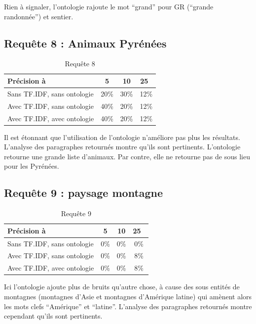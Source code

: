 \documentclass{article}
\begin{document}
Rien à signaler, l’ontologie rajoute le mot “grand” pour GR (“grande randonnée”) et
sentier.

\subsection{Requête 8 : \og Animaux Pyrénées \fg }

\begin{table}[H]
    \centering
    \caption{Requête 8}
\begin{tabular}{|l|c|c|c|}
    \hline
    Précision à & 5 & 10 & 25 \\
    \hline
    Sans TF.IDF, sans ontologie & 20\% & 30\% &  12\% \\
    \hline
    Avec TF.IDF, sans ontologie & 40\% & 20\% &  12\% \\
    \hline
    Avec TF.IDF, avec ontologie & 40\% & 20\% &  12\% \\
    \hline
\end{tabular}
\end{table}

Il est étonnant que l’utilisation de l’ontologie n’améliore pas plus les résultats.
L’analyse des paragraphes retournés montre qu’ils sont pertinents. L’ontologie
retourne une grande liste d’animaux. Par contre, elle ne retourne pas de sous lieu
pour les Pyrénées.

\subsection{Requête 9 : \og paysage montagne \fg }

\begin{table}[H]
    \centering
    \caption{Requête 9}
\begin{tabular}{|l|c|c|c|}
    \hline
    Précision à & 5 & 10 & 25 \\
    \hline
    Sans TF.IDF, sans ontologie & 0\% & 0\% & 0\% \\
    \hline
    Avec TF.IDF, sans ontologie & 0\% & 0\% & 8\% \\
    \hline
    Avec TF.IDF, avec ontologie & 0\% & 0\% & 8\% \\
    \hline
\end{tabular}
\end{table}

Ici l’ontologie ajoute plus de bruits qu’autre chose, à cause des sous entités de
montagnes (montagnes d’Asie et montagnes d’Amérique latine) qui amènent alors les mots
clefs “Amérique” et “latine”. L’analyse des paragraphes retournés montre cependant
qu’ils sont pertinents.
\end{document}

